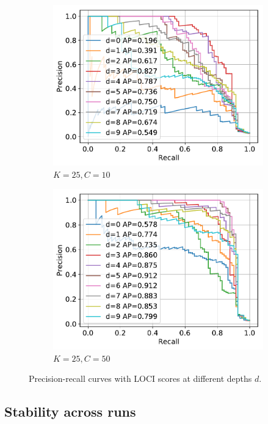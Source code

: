 \documentclass[11pt,onecolumn]{article}
\begin{document}
\begin{figure}[ht!]
\begin{subfigure}[t]{0.24\textwidth}
        \centering
        \includegraphics[width=\linewidth]{fig/chains_lociscore_pr_k25c10d10.pdf}
        \caption{$K=25, C=10$}
    \end{subfigure}
		\hfill
    \begin{subfigure}[t]{0.24\textwidth}
        \centering
        \includegraphics[width=\linewidth]{fig/chains_lociscore_pr_k25c50d10.pdf}
        \caption{$K=25, C=50$}
    \end{subfigure}
    \caption{Precision-recall curves with LOCI scores at different depths $d$.}
\end{figure}

\pagebreak

\subsection{Stability across runs}
\end{document}
